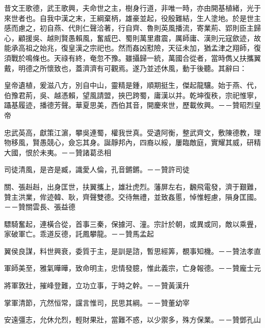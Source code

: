 \begin{pinyinscope}
 
 昔文王歌德，武王歌興，夫命世之主，樹身行道，非唯一時，亦由開基植緒，光于來世者也。自我中漢之末，王綱棄柄，雄豪並起，役殷難結，生人塗地。於是世主感而慮之，初自燕、代則仁聲洽著，行自齊、魯則英風播流，寄業荊、郢則臣主歸心，顧援吳、越則賢愚賴風，奮威巴、蜀則萬里肅震，厲師庸、漢則元寇歛迹，故能承高祖之始兆，復皇漢之宗祀也。然而姦凶懟險，天征未加，猶孟津之翔師，復須戰於鳴條也。天祿有終，奄忽不豫。雖攝歸一統，萬國合從者，當時儁乂扶攜翼戴，明德之所懷致也，蓋濟濟有可觀焉。遂乃並述休風，動于後聽。其辭曰：
 
 
 
 
 皇帝遺植，爰滋八方，別自中山，靈精是鍾，順期挺生，傑起龍驤。始于燕、代，伯豫君荊，吳、越憑賴，望風請盟，挾巴跨蜀，庸漢以并。乾坤復秩，宗祀惟寧，躡基履迹，播德芳聲。華夏思美，西伯其音，開慶來世，歷載攸興。－－贊昭烈皇帝
 
 
 
 
 忠武英高，獻策江濵，攀吳連蜀，權我世真。受遺阿衡，整武齊文，敷陳德教，理物移風，賢愚競心，僉忘其身。誕靜邦內，四裔以綏，屢臨敵庭，實耀其威，研精大國，恨於未夷。－－贊諸葛丞相
 
 
 
 
 司徒清風，是咨是臧，識愛人倫，孔音鏘鏘。－－贊許司徒
 
 
 
 
 關、張赳赳，出身匡世，扶翼攜上，雄壯虎烈。藩屏左右，飜飛電發，濟于艱難，贊主洪業，侔迹韓、耿，齊聲雙德。交待無禮，並致姦慝，悼惟輕慮，隕身匡國。－－贊關雲長、張益德
 
 
 
 
 驃騎奮起，連橫合從，首事三秦，保據河、潼。宗計於朝，或異或同，敵以乘舋，家破軍亡。乖道反德，託鳳攀龍。－－贊馬孟起
 
 
 
 
 翼侯良謀，料世興衰，委質于主，是訓是諮，暫思經筭，覩事知機。－－贊法孝直
 
 
 
 
 軍師美至，雅氣曄曄，致命明主，忠情發臆，惟此義宗，亡身報德。－－贊龐士元
 
 
 
 
 將軍敦壯，摧峰登難，立功立事，于時之幹。－－贊黃漢升
 
 
 
 
 掌軍清節，亢然恒常，讜言惟司，民思其綱。－－贊董幼宰
 
 
安遠彊志，允休允烈，輕財果壯，當難不惑，以少禦多，殊方保業。－－贊鄧孔山
 

\end{pinyinscope}
